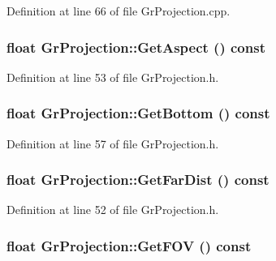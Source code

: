 Definition at line 66 of file GrProjection.cpp.\hypertarget{class_gr_projection_5690aacaed6e6c2e123bb96124253744}{
\subsubsection[{GetAspect}]{\setlength{\rightskip}{0pt plus 5cm}float GrProjection::GetAspect () const}}
\label{class_gr_projection_5690aacaed6e6c2e123bb96124253744}




Definition at line 53 of file GrProjection.h.\hypertarget{class_gr_projection_ba40dc8e83e97f131286ef4daff3f459}{
\subsubsection[{GetBottom}]{\setlength{\rightskip}{0pt plus 5cm}float GrProjection::GetBottom () const}}
\label{class_gr_projection_ba40dc8e83e97f131286ef4daff3f459}




Definition at line 57 of file GrProjection.h.\hypertarget{class_gr_projection_ff3730ac4fd84de25306fa8e6d1abfa6}{
\subsubsection[{GetFarDist}]{\setlength{\rightskip}{0pt plus 5cm}float GrProjection::GetFarDist () const}}
\label{class_gr_projection_ff3730ac4fd84de25306fa8e6d1abfa6}




Definition at line 52 of file GrProjection.h.\hypertarget{class_gr_projection_6460a0de198599bf156dc32d059cccbe}{
\subsubsection[{GetFOV}]{\setlength{\rightskip}{0pt plus 5cm}float GrProjection::GetFOV () const}}
\label{class_gr_projection_6460a0de198599bf156dc32d059cccbe}




